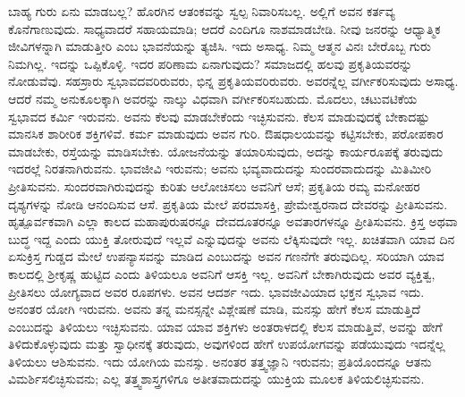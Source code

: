 ಬಾಹ್ಯ ಗುರು ಏನು ಮಾಡಬಲ್ಲ? ಹೊರಗಿನ ಆತಂಕವನ್ನು ಸ್ವಲ್ಪ ನಿವಾರಿಸಬಲ್ಲ. ಅಲ್ಲಿಗೆ ಅವನ ಕರ್ತವ್ಯ ಕೊನೆಗಾಣುವುದು. ಸಾಧ್ಯವಾದರೆ ಸಹಾಯಮಾಡಿ; ಆದರೆ ಎಂದಿಗೂ ನಾಶಮಾಡಬೇಡಿ. ನೀವು ಜನರನ್ನು ಆಧ್ಯಾತ್ಮಿಕ ಜೀವಿಗಳನ್ನಾಗಿ ಮಾಡುತ್ತೀರಿ ಎಂಬ ಭಾವನೆಯನ್ನು ತ್ಯಜಿಸಿ. ಇದು ಅಸಾಧ್ಯ. ನಿಮ್ಮ ಆತ್ಮನ ವಿನಃ ಬೇರೊಬ್ಬ ಗುರು ನಿಮಗಿಲ್ಲ. ಇದನ್ನು ಒಪ್ಪಿಕೊಳ್ಳಿ. ಇದರ ಪರಿಣಾಮ ಏನಾಗುವುದು? ಸಮಾಜದಲ್ಲಿ ಹಲವು ಪ್ರಕೃತಿಯವರನ್ನು ನೋಡುವೆವು. ಸಹಸ್ರಾರು ಸ್ವಭಾವದವರಿರುವರು, ಭಿನ್ನ ಪ್ರಕೃತಿಯವರಿರುವರು. ಅವರನ್ನೆಲ್ಲ ವರ್ಗೀಕರಿಸುವುದು ಅಸಾಧ್ಯ. ಆದರೆ ನಮ್ಮ ಅನುಕೂಲಕ್ಕಾಗಿ ಅವರನ್ನು ನಾಲ್ಕು ವಿಧವಾಗಿ ವರ್ಗೀಕರಿಸಬಹುದು. ಮೊದಲು, ಚಟುವಟಿಕೆಯ ಸ್ವಭಾವದ ಕರ್ಮಿ ಇರುವನು. ಅವನು ಕೆಲವು ಮಾಡಬೇಕೆಂದು ಇಚ್ಛಿಸುವನು. ಕೆಲಸ ಮಾಡುವುದಕ್ಕೆ ಬೇಕಾದಷ್ಟು ಮಾನಸಿಕ ಶಾರೀರಿಕ ಶಕ್ತಿಗಳಿವೆ. ಕರ್ಮ ಮಾಡುವುದು ಅವನ ಗುರಿ. ಔಷಧಾಲಯವನ್ನು ಕಟ್ಟಿಸಬೇಕು, ಪರೋಪಕಾರ ಮಾಡಬೇಕು, ರಸ್ತೆಯನ್ನು ಮಾಡಿಸಬೇಕು. ಯೋಜನೆಯನ್ನು ತಯಾರಿಸುವುದು, ಅದನ್ನು ಕಾರ್ಯರೂಪಕ್ಕೆ ತರುವುದು ಇದರಲ್ಲೆ ನಿರತನಾಗಿರುವನು. ಭಾವಜೀವಿ ಇರುವನು; ಅವನು ಭವ್ಯವಾದುದನ್ನು ಸುಂದರವಾದುದನ್ನು ಮಿತಿಮೀರಿ ಪ್ರೀತಿಸುವನು. ಸುಂದರವಾಗಿರುವುದನ್ನು ಕುರಿತು ಆಲೋಚಿಸಲು ಅವನಿಗೆ ಆಸೆ; ಪ್ರಕೃತಿಯ ರಮ್ಯ ಮನೋಹರ ದೃಶ್ಯಗಳನ್ನು ನೋಡಿ ಆನಂದಿಸುವ ಆಸೆ. ಪ್ರಕೃತಿಯ ಮೇಲೆ ಪರಮಾಸಕ್ತಿ, ಪ್ರೇಮೇಶ್ವರನಾದ ದೇವರನ್ನು ಪ್ರೀತಿಸುವನು. ಹೃತ್ಪೂರ್ವಕವಾಗಿ ಎಲ್ಲಾ ಕಾಲದ ಮಹಾಪುರುಷರನ್ನೂ ದೇವದೂತರನ್ನೂ ಅವತಾರಗಳನ್ನೂ ಪ್ರೀತಿಸುವನು. ಕ್ರಿಸ್ತ ಅಥವಾ ಬುದ್ಧ ಇದ್ದ ಎಂದು ಯುಕ್ತಿ ತೋರುವುದೆ ಇಲ್ಲವೆ ಎನ್ನುವುದನ್ನು ಅವನು ಲೆಕ್ಕಿಸುವುದೇ ಇಲ್ಲ. ಖಚಿತವಾಗಿ ಯಾವ ದಿನ ಏಸುಕ್ರಿಸ್ತ ಗುಡ್ಡದ ಮೇಲೆ ಉಪನ್ಯಾಸವನ್ನು ಮಾಡಿದ ಎಂಬುದನ್ನು ಅವನ ಗಣನೆಗೇ ತರುವುದಿಲ್ಲ. ಸರಿಯಾಗಿ ಯಾವ ಕಾಲದಲ್ಲಿ ಶ‍್ರೀಕೃಷ್ಣ ಹುಟ್ಟಿದ ಎಂದು ತಿಳಿಯಲೂ ಅವನಿಗೆ ಆಸಕ್ತಿ ಇಲ್ಲ. ಅವನಿಗೆ ಬೇಕಾಗಿರುವುದು ಅವರ ವ್ಯಕ್ತಿತ್ವ, ಪ್ರೀತಿಸಲು ಯೋಗ್ಯವಾದ ಅವರ ರೂಪಗಳು. ಅವನ ಆದರ್ಶ ಇದು. ಭಾವಜೀವಿಯಾದ ಭಕ್ತನ ಸ್ವಭಾವ ಇದು. ಅನಂತರ ಯೋಗಿ ಇರುವನು. ಅವನು ತನ್ನ ಮನಸ್ಸನ್ನೇ ವಿಶ್ಲೇಷಣೆ ಮಾಡಿ, ಮನಸ್ಸು ಹೇಗೆ ಕೆಲಸ ಮಾಡುತ್ತಿದೆ ಎಂಬುದನ್ನು ತಿಳಿಯಲು ಇಚ್ಛಿಸುವನು. ಯಾವ ಯಾವ ಶಕ್ತಿಗಳು ಅಂತರಾಳದಲ್ಲಿ ಕೆಲಸ ಮಾಡುತ್ತಿವೆ, ಅವನ್ನು ಹೇಗೆ ತಿಳಿದುಕೊಳ್ಳುವುದು ಮತ್ತು ಸ್ವಾಧೀನಕ್ಕೆ ತರುವುದು, ಅವುಗಳಿಂದ ಹೇಗೆ ಉಪಯೋಗವನ್ನು ಪಡೆಯುವುದು ಇದನ್ನೆಲ್ಲ ತಿಳಿಯಲು ಆಶಿಸುವನು. ಇದು ಯೋಗಿಯ ಮನಸ್ಸು. ಅನಂತರ ತತ್ತ್ವಜ್ಞಾನಿ ಇರುವನು; ಪ್ರತಿಯೊಂದನ್ನೂ ಆತನು ವಿಮರ್ಶಿಸಲಿಚ್ಛಿಸುವನು; ಎಲ್ಲ ತತ್ತ್ವಶಾಸ್ತ್ರಗಳಿಗೂ ಅತೀತವಾದುದನ್ನು ಯುಕ್ತಿಯ ಮೂಲಕ ತಿಳಿಯಲಿಚ್ಛಿಸುವನು.


